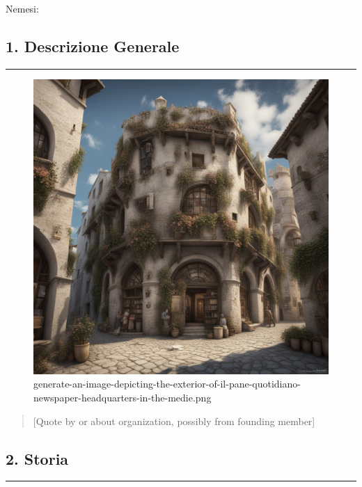 Nemesi:

\subsection{1. Descrizione Generale}\label{descrizione-generale}

\begin{center}\rule{0.5\linewidth}{0.5pt}\end{center}

\begin{figure}
\centering
\includegraphics{generate-an-image-depicting-the-exterior-of-il-pane-quotidiano-newspaper-headquarters-in-the-medie.png}
\caption{generate-an-image-depicting-the-exterior-of-il-pane-quotidiano-newspaper-headquarters-in-the-medie.png}
\end{figure}

\begin{quote}
{[}Quote by or about organization, possibly from founding member{]}
\end{quote}

\subsection{2. Storia}\label{storia}

\begin{center}\rule{0.5\linewidth}{0.5pt}\end{center}

